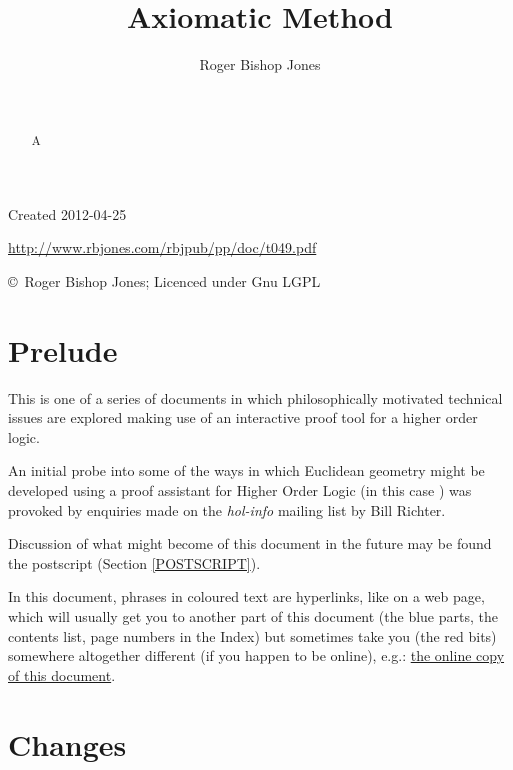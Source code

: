 \documentclass[11pt]{article}
\title{Axiomatic Method}
\author{Roger Bishop Jones}
\date{\ }
\begin{document}
\begin{titlepage}
\maketitle
\begin{abstract}
A 
\end{abstract}
\vfill

\begin{centering}
{\footnotesize

Created 2012-04-25



\href{http://www.rbjones.com/rbjpub/pp/doc/t049.pdf}
{http://www.rbjones.com/rbjpub/pp/doc/t049.pdf}

\copyright\ Roger Bishop Jones; Licenced under Gnu LGPL

}%
\end{centering}

\thispagestyle{empty}
\end{titlepage}

\newpage
\addtocounter{page}{1}
{\parskip=0pt\tableofcontents}

\section{Prelude}

This is one of a series of documents in which philosophically motivated technical issues are explored making use of an interactive proof tool for a higher order logic.

An initial probe into some of the ways in which Euclidean geometry might be developed using a proof assistant for Higher Order Logic (in this case \Product) was provoked by enquiries made on the \emph{hol-info} mailing list by Bill Richter.

Discussion of what might become of this document in the future may be found the postscript (Section \ref{POSTSCRIPT}).

In this document, phrases in coloured text are hyperlinks, like on a web page, which will usually get you to another part of this document (the blue parts, the contents list, page numbers in the Index) but sometimes take you (the red bits) somewhere altogether different (if you happen to be online), e.g.: \href{http://rbjones.com/rbjpub/pp/doc/t048.pdf}{the online copy of this document}.

\section{Changes}
\end{document}
